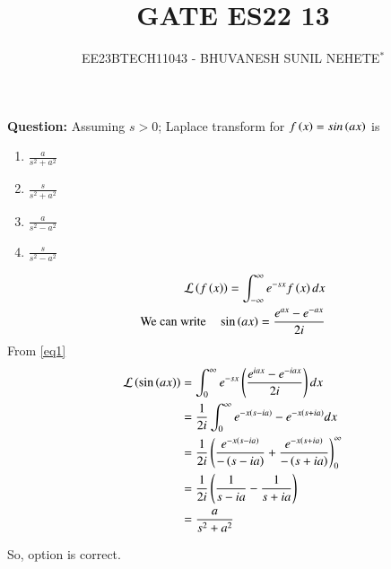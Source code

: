 \documentclass[journal,12pt,twocolumn]{IEEEtran}
\theoremstyle{remark}
\begin{document}

\vspace{3cm}

\title{GATE ES22 13}
\author{EE23BTECH11043 - BHUVANESH SUNIL NEHETE$^{*}$%
}
\maketitle
\newpage
\bigskip

\renewcommand{\thefigure}{\theenumi}
\renewcommand{\thetable}{\theenumi}



\textbf{Question:}
Assuming $s>0$; Laplace transform for $f\left(x\right) = sin\left(ax\right)$ is
\begin{enumerate}[label=(\Alph*)]
    \item $\frac{a}{s^2+a^2}$
    \item $\frac{s}{s^2+a^2}$
    \item $\frac{a}{s^2-a^2}$
    \item $\frac{s}{s^2-a^2}$
\end{enumerate}

\solution

\begin{align}
\mathcal{L}\left(f\left(x\right)\right)=\int_{-\infty}^{\infty}e^{-sx}f\left(x\right)dx\\
\text{We can write} \quad\sin\left(ax\right)=\frac{e^{ax}-e^{-ax}}{2i}\label{eq1}
\end{align}
From \eqref{eq1}
\begin{align}
\mathcal{L}\left(\sin\left(ax\right)\right)&=\int_{0}^{\infty}e^{-sx}\left(\frac{e^{iax}-e^{-iax}}{2i}\right)dx\\
&=\frac{1}{2i}\int_{0}^{\infty}e^{-x\left(s-ia\right)}-e^{-x\left(s+ia\right)}dx\\
&=\frac{1}{2i}\left(\frac{e^{-x\left(s-ia\right)}}{-\left(s-ia\right)}+\frac{e^{-x\left(s+ia\right)}}{-\left(s+ia\right)}\right)_{0}^{\infty}\\
&=\frac{1}{2i}\left(\frac{1}{s-ia}-\frac{1}{s+ia}\right)\\
&=\frac{a}{s^2+a^2}
\end{align}

So, option  is correct.
 
\end{document}
